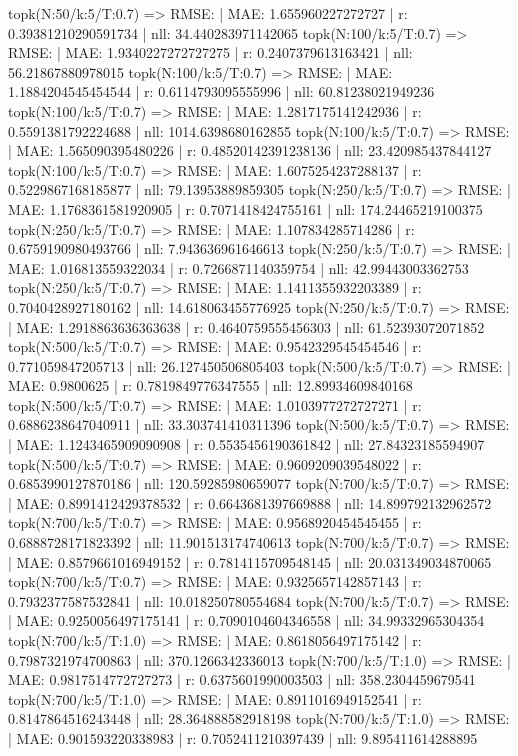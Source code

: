 topk(N:50/k:5/T:0.7) => RMSE: | MAE: 1.655960227272727 | r: 0.39381210290591734 | nll: 34.440283971142065
topk(N:100/k:5/T:0.7) => RMSE: | MAE: 1.9340227272727275 | r: 0.2407379613163421 | nll: 56.21867880978015
topk(N:100/k:5/T:0.7) => RMSE: | MAE: 1.1884204545454544 | r: 0.6114793095555996 | nll: 60.81238021949236
topk(N:100/k:5/T:0.7) => RMSE: | MAE: 1.2817175141242936 | r: 0.5591381792224688 | nll: 1014.6398680162855
topk(N:100/k:5/T:0.7) => RMSE: | MAE: 1.565090395480226 | r: 0.48520142391238136 | nll: 23.420985437844127
topk(N:100/k:5/T:0.7) => RMSE: | MAE: 1.6075254237288137 | r: 0.5229867168185877 | nll: 79.13953889859305
topk(N:250/k:5/T:0.7) => RMSE: | MAE: 1.1768361581920905 | r: 0.7071418424755161 | nll: 174.24465219100375
topk(N:250/k:5/T:0.7) => RMSE: | MAE: 1.107834285714286 | r: 0.6759190980493766 | nll: 7.943636961646613
topk(N:250/k:5/T:0.7) => RMSE: | MAE: 1.016813559322034 | r: 0.7266871140359754 | nll: 42.99443003362753
topk(N:250/k:5/T:0.7) => RMSE: | MAE: 1.1411355932203389 | r: 0.7040428927180162 | nll: 14.618063455776925
topk(N:250/k:5/T:0.7) => RMSE: | MAE: 1.2918863636363638 | r: 0.4640759555456303 | nll: 61.52393072071852
topk(N:500/k:5/T:0.7) => RMSE: | MAE: 0.9542329545454546 | r: 0.771059847205713 | nll: 26.127450506805403
topk(N:500/k:5/T:0.7) => RMSE: | MAE: 0.9800625 | r: 0.7819849776347555 | nll: 12.89934609840168
topk(N:500/k:5/T:0.7) => RMSE: | MAE: 1.0103977272727271 | r: 0.6886238647040911 | nll: 33.303741410311396
topk(N:500/k:5/T:0.7) => RMSE: | MAE: 1.1243465909090908 | r: 0.5535456190361842 | nll: 27.84323185594907
topk(N:500/k:5/T:0.7) => RMSE: | MAE: 0.9609209039548022 | r: 0.6853990127870186 | nll: 120.59285980659077
topk(N:700/k:5/T:0.7) => RMSE: | MAE: 0.8991412429378532 | r: 0.6643681397669888 | nll: 14.899792132962572
topk(N:700/k:5/T:0.7) => RMSE: | MAE: 0.9568920454545455 | r: 0.6888728171823392 | nll: 11.901513174740613
topk(N:700/k:5/T:0.7) => RMSE: | MAE: 0.8579661016949152 | r: 0.7814115709548145 | nll: 20.031349034870065
topk(N:700/k:5/T:0.7) => RMSE: | MAE: 0.9325657142857143 | r: 0.7932377587532841 | nll: 10.018250780554684
topk(N:700/k:5/T:0.7) => RMSE: | MAE: 0.9250056497175141 | r: 0.7090104604346558 | nll: 34.99332965304354
topk(N:700/k:5/T:1.0) => RMSE: | MAE: 0.8618056497175142 | r: 0.7987321974700863 | nll: 370.1266342336013
topk(N:700/k:5/T:1.0) => RMSE: | MAE: 0.9817514772727273 | r: 0.6375601990003503 | nll: 358.2304459679541
topk(N:700/k:5/T:1.0) => RMSE: | MAE: 0.8911016949152541 | r: 0.8147864516243448 | nll: 28.364888582918198
topk(N:700/k:5/T:1.0) => RMSE: | MAE: 0.901593220338983 | r: 0.7052411210397439 | nll: 9.895411614288895
